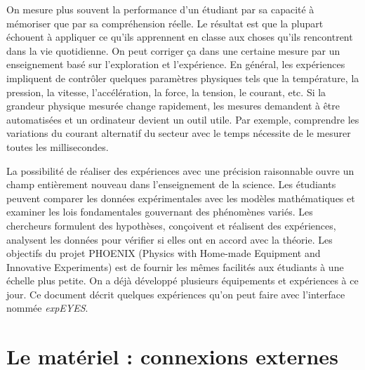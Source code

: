 \documentclass{book}
\begin{document}
On mesure plus souvent la performance d'un étudiant par sa capacité à mémoriser que par sa compréhension réelle. Le résultat est que la plupart échouent à appliquer ce qu'ils apprennent en classe aux choses qu'ils rencontrent dans la vie quotidienne. On peut corriger ça dans une certaine mesure par un enseignement basé sur l'exploration et l'expérience. En général, les expériences impliquent de contrôler quelques paramètres physiques tels que la température, la pression, la vitesse, l'accélération, la force, la tension, le courant, etc. Si la grandeur physique mesurée change rapidement, les mesures demandent à être automatisées et un ordinateur devient un outil utile. Par exemple, comprendre les variations du courant alternatif du secteur avec le temps nécessite de le mesurer toutes les millisecondes.



La possibilité de réaliser des expériences avec une précision raisonnable ouvre un champ entièrement nouveau dans l'enseignement de la science. Les étudiants peuvent comparer les données expérimentales avec les modèles mathématiques et examiner les lois fondamentales gouvernant des phénomènes variés. Les chercheurs formulent des hypothèses, conçoivent et réalisent des expériences, analysent les données pour vérifier si elles ont en accord avec la théorie. Les objectifs du projet PHOENIX (Physics with Home-made Equipment and Innovative Experiments) est de fournir les mêmes facilités aux étudiants à une échelle plus petite. On a déjà développé plusieurs équipements et expériences à ce jour. Ce document décrit quelques expériences qu'on peut faire avec l'interface nommée \emph{expEYES}.

\section{Le matériel : connexions externes}
\end{document}
